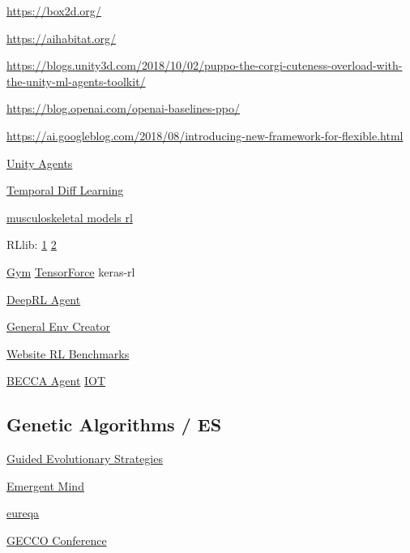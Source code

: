 \documentclass[]{book}
\begin{document}
\url{https://box2d.org/}

\url{https://aihabitat.org/}

\url{https://blogs.unity3d.com/2018/10/02/puppo-the-corgi-cuteness-overload-with-the-unity-ml-agents-toolkit/}

\url{https://blog.openai.com/openai-baselines-ppo/}

\url{https://ai.googleblog.com/2018/08/introducing-new-framework-for-flexible.html}

\href{https://blogs.unity3d.com/2017/12/08/introducing-ml-agents-v0-2-curriculum-learning-new-environments-and-more/}{Unity
Agents}

\href{https://harderchoices.com/2018/06/07/temporal-difference-learning-in-python/}{Temporal
Diff Learning}

\href{http://osim-rl.stanford.edu}{musculoskeletal models rl}

RLlib:
\href{https://www.oreilly.com/ideas/introducing-rllib-a-composable-and-scalable-reinforcement-learning-library}{1}
\textbar{} \href{https://ray.readthedocs.io/en/latest/rllib.html}{2}

\href{https://blog.openai.com/gym-retro}{Gym} \textbar{}
\href{https://reinforce.io/blog/introduction-to-tensorforce/}{TensorForce}
\textbar{} keras-rl

\href{https://deepmind.com/blog/impala-scalable-distributed-deeprl-dmlab-30/}{DeepRL
Agent}

\href{https://openai.com/blog/universe/}{General Env Creator}

\href{http://alpha.openai.com/miniwob/index.html}{Website RL Benchmarks}

\href{https://brohrer.github.io/becca_6_chase_demo.html}{BECCA Agent}
\textbar{}
\href{https://brohrer.github.io/adaptive_reinforcement_learning_iot.html}{IOT}

\subsection{Genetic Algorithms / ES}\label{genetic-algorithms-es}

\href{https://twitter.com/hardmaru/status/1012142197334892545}{Guided
Evolutionary Strategies}

\href{http://www.emergentmind.com}{Emergent Mind}

\href{http://www.nutonian.com/products/eureqa/}{eureqa}

\href{http://gecco-2016.sigevo.org/index.html/HomePage\#\&panel1-1}{GECCO
Conference}
\end{document}
